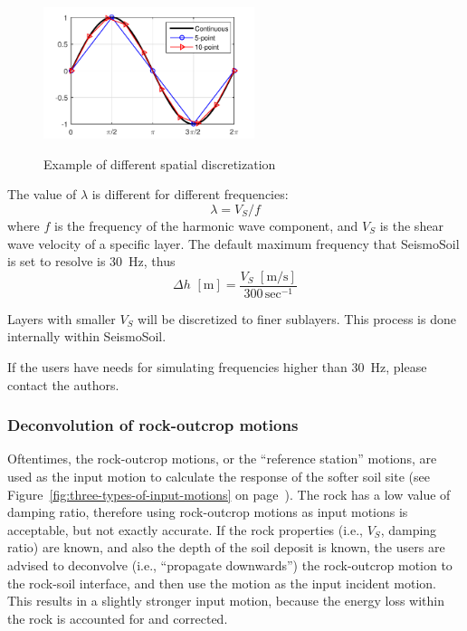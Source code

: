 \documentclass[11pt,letterpaper]{article}
\begin{document}
\begin{figure}[h]
	\centering
	\includegraphics[width=0.55\textwidth]{spatial_discretization.pdf}\\
	\caption{Example of different spatial discretization}\label{fig:spatial_discretization}
\end{figure}

The value of $ \lambda $ is different for different frequencies:
\[
\lambda = V_S/f
\]
where $ f $ is the frequency of the harmonic wave component, and $ V_S $ is the shear wave velocity of a specific layer. The default maximum frequency that SeismoSoil is set to resolve is 30~Hz, thus
\[
\Delta h \,\,[\mathrm{m}] = \frac{V_S\,\,[\mathrm{m/s}]}{300\,\mathrm{sec}^{-1}}
\]


Layers with smaller $ V_S $ will be discretized to finer sublayers. This process is done internally within SeismoSoil.

If the users have needs for simulating frequencies higher than 30~Hz, please contact the authors.




\subsubsection{Deconvolution of rock-outcrop motions}\label{sec:deconvolution}

Oftentimes, the rock-outcrop motions, or the ``reference station'' motions, are used as the input motion to calculate the response of the softer soil site (see Figure~\ref{fig:three-types-of-input-motions} on page~\pageref{fig:three-types-of-input-motions}). The rock has a low value of damping ratio, therefore using rock-outcrop motions as input motions is acceptable, but not exactly accurate. If the rock properties (i.e., $V_S$, damping ratio) are known, and also the depth of the soil deposit is known, the users are advised to deconvolve (i.e., ``propagate downwards'') the rock-outcrop motion to the rock-soil interface, and then use the motion as the input incident motion. This results in a slightly stronger input motion, because the energy loss within the rock is accounted for and corrected.





\end{document}

